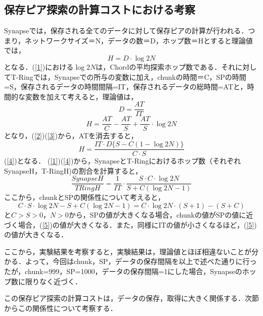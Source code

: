 \subsection{保存ピア探索の計算コストにおける考察}
Synapseでは，保存される全てのデータに対して保存ピアの計算が行われる．つまり，ネットワークサイズ＝N，データの数＝D，ホップ数＝Hとすると理論値では，
\begin{equation}
H=D\cdot\log{2}N \label{1}
\end{equation}
となる．(\ref{1})における$\log{2}N$は，Chordの平均探索ホップ数である．それに対してT-Ringでは，Synapseでの所与の変数に加え，chunkの時間＝C，SPの時間=S，保存されるデータの時間間隔=IT，保存されるデータの総時間=ATと，時間的な変数を加えて考えると，理論値は，
\begin{equation}
D= \frac{AT}{IT} \label{2}
\end{equation}
\begin{equation}
H=\frac{AT}{C}- \frac{AT}{S} + \frac{AT}{S} \cdot\log{2}N \label{3}
\end{equation}
となり，(\ref{2})(\ref{3})から，ATを消去すると，
\begin{equation}
H=\frac{IT \cdot D\{S - C (1- \log{2}N ) \} }{C \cdot S} \label{4}
\end{equation}
(\ref{4})となる．
(\ref{1})(\ref{4})から，SynapseとT-Ringにおけるホップ数（それぞれSynapseH，T-RingH)の割合を計算すると，
\begin{equation}
\frac{SynapseH}{TRingH}=\frac{1}{IT} \cdot \frac{S \cdot C \cdot \log{2}N }{S + C(\log{2}N -1)}     \label{5}
\end{equation}
ここから，chunkとSPの関係性について考えると，
\begin{equation}
C \cdot S \cdot \log{2}N - S + C(\log{2}N - 1) = C \cdot \log{2} N \cdot (S+1) - ( S + C )
\end{equation}
と$C>S>0$，$N>0$から，SPの値が大きくなる場合，chunkの値がSPの値に近づく場合，(\ref{5})の値が大きくなる．また，同様にITの値が小さくなるほど，(\ref{5})の値が大きくなる．

ここから，実験結果を考察すると，実験結果は，理論値とほぼ相違ないことが分かる．よって，今回はchunk，SP，データの保存間隔を以上で述べた通りに行ったが，chunk=999，SP=1000，データの保存間隔=1にした場合，Synapseのホップ数に限りなく近づく．

この保存ピア探索の計算コストは，データの保存，取得に大きく関係する．次節からこの関係性について考察する．
